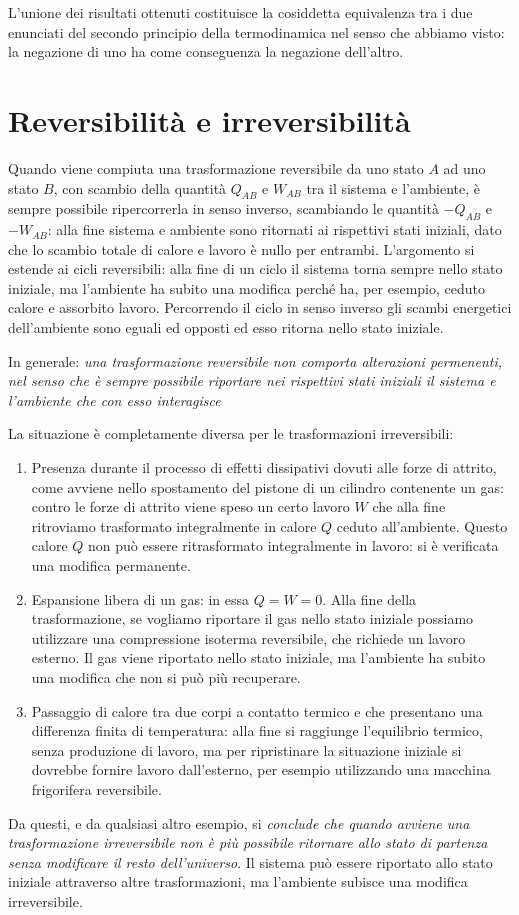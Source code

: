 \documentclass[class=book, crop=false, oneside, 12pt]{standalone}
\begin{document}
L'unione dei risultati ottenuti costituisce la cosiddetta equivalenza tra i due enunciati del secondo principio della termodinamica nel senso che abbiamo visto: la negazione di uno ha come conseguenza la negazione dell'altro.

\section{Reversibilità e irreversibilità}

Quando viene compiuta una trasformazione reversibile da uno stato \(A\) ad uno stato \(B\), con scambio della quantità \(Q_{AB}\) e \(W_{AB}\) tra il sistema e l'ambiente, è sempre possibile ripercorrerla in senso inverso, scambiando le quantità \(-Q_{AB}\) e \(-W_{AB}\): alla fine sistema e ambiente sono ritornati ai rispettivi stati iniziali, dato che lo scambio totale di calore e lavoro è nullo per entrambi. 
L'argomento si estende ai cicli reversibili: alla fine di un ciclo il sistema torna sempre nello stato iniziale, ma l'ambiente ha subito una modifica perché ha, per esempio, ceduto calore e assorbito lavoro. 
Percorrendo il ciclo in senso inverso gli scambi energetici dell'ambiente sono eguali ed opposti ed esso ritorna nello stato iniziale.

In generale: \emph{una trasformazione reversibile non comporta alterazioni permenenti, nel senso che è sempre possibile riportare nei rispettivi stati iniziali il sistema e l'ambiente che con esso interagisce}

La situazione è completamente diversa per le trasformazioni irreversibili:
\begin{enumerate}
    \item Presenza durante il processo di effetti dissipativi dovuti alle forze di attrito, come avviene nello spostamento del pistone di un cilindro contenente un gas: contro le forze di attrito viene speso un certo lavoro \(W\) che alla fine ritroviamo trasformato integralmente in calore \(Q\) ceduto all'ambiente. 
    Questo calore \(Q\) non può essere ritrasformato integralmente in lavoro: si è verificata una modifica permanente. 
    \item Espansione libera di un gas: in essa \(Q = W = 0\). 
    Alla fine della trasformazione, se vogliamo riportare il gas nello stato iniziale possiamo utilizzare una compressione isoterma reversibile, che richiede un lavoro esterno. 
    Il gas viene riportato nello stato iniziale, ma l'ambiente ha subito una modifica che non si può più recuperare. 
    \item Passaggio di calore tra due corpi a contatto termico e che presentano una differenza finita di temperatura: alla fine si raggiunge l'equilibrio termico, senza produzione di lavoro, ma per ripristinare la situazione iniziale si dovrebbe fornire lavoro dall'esterno, per esempio utilizzando una macchina frigorifera reversibile.
\end{enumerate}
Da questi, e da qualsiasi altro esempio, si \emph{conclude che quando avviene una trasformazione irreversibile non è più possibile ritornare allo stato di partenza senza modificare il resto dell'universo}. 
Il sistema può essere riportato allo stato iniziale attraverso altre trasformazioni, ma l'ambiente subisce una modifica irreversibile.
\end{document}
